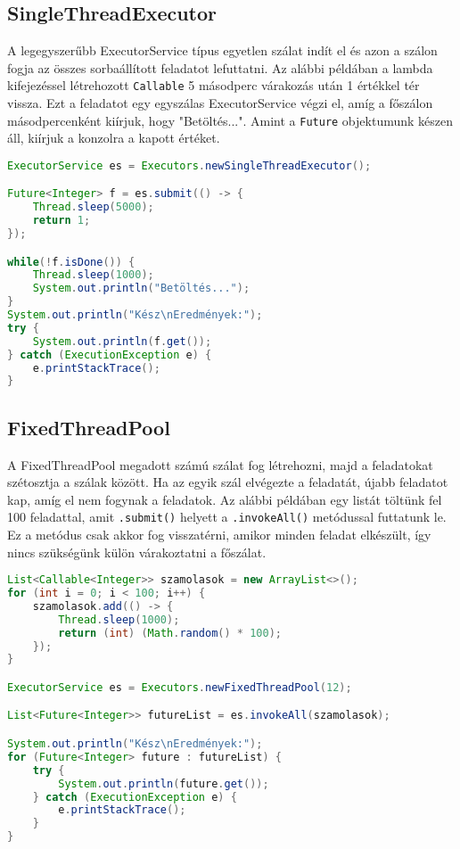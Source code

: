\documentclass{article}
\let\l\lstinline
\begin{document}
\subsection{SingleThreadExecutor}

	A legegyszerűbb ExecutorService típus egyetlen szálat indít el és azon a szálon fogja az összes sorbaállított feladatot lefuttatni. Az alábbi példában a lambda kifejezéssel létrehozott \l{Callable} 5 másodperc várakozás után 1 értékkel tér vissza. Ezt a feladatot egy egyszálas ExecutorService végzi el, amíg a főszálon másodpercenként kiírjuk, hogy "Betöltés...". Amint a \l{Future} objektumunk készen áll, kiírjuk a konzolra a kapott értéket.

\begin{lstlisting}[language=Java, caption=SingleThreadExecutor és Future használata]
ExecutorService es = Executors.newSingleThreadExecutor();

Future<Integer> f = es.submit(() -> {
	Thread.sleep(5000);
	return 1;
});

while(!f.isDone()) {
	Thread.sleep(1000);
	System.out.println("Betöltés...");
}
System.out.println("Kész\nEredmények:");
try {
	System.out.println(f.get());
} catch (ExecutionException e) {
	e.printStackTrace();
}
\end{lstlisting}

\subsection{FixedThreadPool}

A FixedThreadPool megadott számú szálat fog létrehozni, majd a feladatokat szétosztja a szálak között. Ha az egyik szál elvégezte a feladatát, újabb feladatot kap, amíg el nem fogynak a feladatok. Az alábbi példában egy listát töltünk fel 100 feladattal, amit \l{.submit()} helyett a \l{.invokeAll()} metódussal futtatunk le. Ez a metódus csak akkor fog visszatérni, amikor minden feladat elkészült, így nincs szükségünk külön várakoztatni a főszálat.

\begin{lstlisting}[language=Java, caption=FixedThreadExecutor és Future használata]
List<Callable<Integer>> szamolasok = new ArrayList<>();
for (int i = 0; i < 100; i++) {
	szamolasok.add(() -> {
		Thread.sleep(1000);
		return (int) (Math.random() * 100);
	});
}

ExecutorService es = Executors.newFixedThreadPool(12);

List<Future<Integer>> futureList = es.invokeAll(szamolasok);

System.out.println("Kész\nEredmények:");
for (Future<Integer> future : futureList) {
	try {
		System.out.println(future.get());
	} catch (ExecutionException e) {
		e.printStackTrace();
	}
}
\end{lstlisting}
\end{document}
